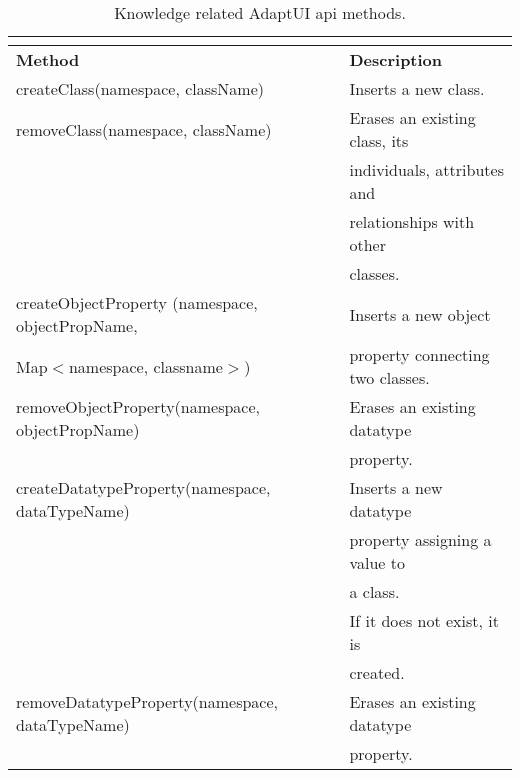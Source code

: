 \begin{center}
\footnotesize
\begin{longtable}{l l}
  \caption{Knowledge related AdaptUI \ac{api} methods.}\\
  \label{tbl:api_knowledge} \\
  \hline 
  \textbf{Method}		& \textbf{Description}\\
  \hline
  createClass(namespace, className)	& Inserts a new class.		\\
  removeClass(namespace, className)	& Erases an existing class, its	\\
					& individuals, attributes and	\\
					& relationships with other 	\\
					& classes.			\\
  \hline 
  createObjectProperty	(namespace, objectPropName,& Inserts a new object\\
  Map$<$namespace, classname$>$)	& property connecting two classes.\\
  removeObjectProperty(namespace, objectPropName)& Erases an existing datatype\\
 					& property.			\\
  \hline 
  createDatatypeProperty(namespace, dataTypeName)	& Inserts a new datatype\\
					& property assigning a value to \\
 					& a class.			\\
					& If it does not exist, it is	\\
					& created.			\\
  removeDatatypeProperty(namespace, dataTypeName)& Erases an existing datatype\\
 					& property.			\\

\end{longtable}
\end{center}
